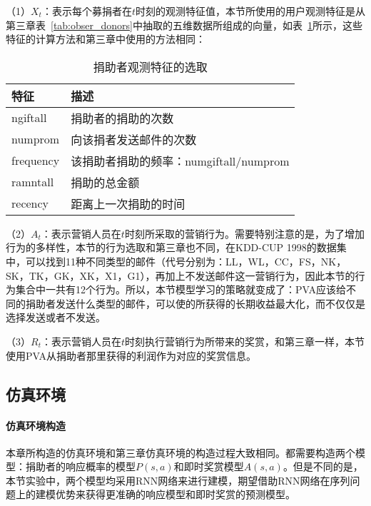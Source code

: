 
（1）$X_{t}$：表示每个募捐者在$t$时刻的观测特征值，本节所使用的用户观测特征是从第三章表~\ref{tab:obser_donors}中抽取的五维数据所组成的向量，如表~\ref{tab:obser_donors4}所示，这些特征的计算方法和第三章中使用的方法相同：
\begin{table}[htbp]
  \centering
  \caption{捐助者观测特征的选取}
  \label{tab:obser_donors4}
  \begin{tabular}{ll}
    \toprule
      特征 & 描述 \\
    \midrule
      ngiftall & 捐助者的捐助的次数 \\
      numprom & 向该捐者发送邮件的次数 \\
      frequency & 该捐助者捐助的频率：numgiftall/numprom\\
      ramntall & 捐助的总金额 \\
      recency & 距离上一次捐助的时间 \\
    \bottomrule
  \end{tabular}
\end{table}

（2）$A_{t}$：表示营销人员在$t$时刻所采取的营销行为。需要特别注意的是，为了增加行为的多样性，本节的行为选取和第三章也不同，在KDD-CUP 1998的数据集中，可以找到11种不同类型的邮件（代号分别为：LL，WL，CC，FS，NK，SK，TK，GK，XK，X1，G1），再加上不发送邮件这一营销行为，因此本节的行为集合中一共有12个行为。所以，本节模型学习的策略就变成了：PVA应该给不同的捐助者发送什么类型的邮件，可以使的所获得的长期收益最大化，而不仅仅是选择发送或者不发送。

（3）$R_{t}$：表示营销人员在$t$时刻执行营销行为所带来的奖赏，和第三章一样，本节使用PVA从捐助者那里获得的利润作为对应的奖赏信息。

\subsection{仿真环境}
\paragraph{仿真环境构造}
本章所构造的仿真环境和第三章仿真环境的构造过程大致相同。都需要构造两个模型：捐助者的响应概率的模型$P(s,a)$和即时奖赏模型$A(s,a)$。但是不同的是，本节实验中，两个模型均采用RNN网络来进行建模，期望借助RNN网络在序列问题上的建模优势来获得更准确的响应模型和即时奖赏的预测模型。

